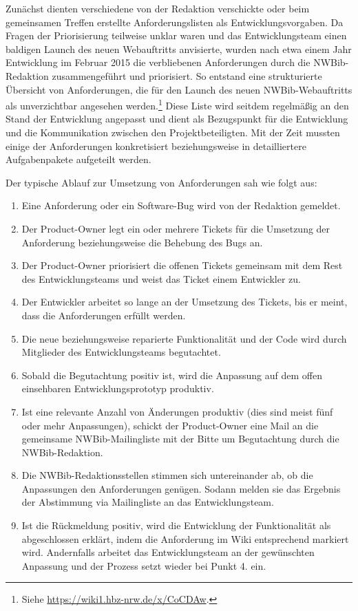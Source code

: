 \documentclass[a4paper,
fontsize=11pt,
oneside,
numbers=noperiodatend,
parskip=half-,
bibliography=totoc,
final
]{scrartcl}
\providecommand{\tightlist}{%
  \setlength{\itemsep}{0pt}\setlength{\parskip}{0pt}}
\begin{document}
Zunächst dienten verschiedene von der Redaktion verschickte oder beim
gemeinsamen Treffen erstellte Anforderungslisten als
Entwicklungsvorgaben. Da Fragen der Priorisierung teilweise unklar waren
und das Entwicklungsteam einen baldigen Launch des neuen Webauftritts
anvisierte, wurden nach etwa einem Jahr Entwicklung im Februar 2015 die
verbliebenen Anforderungen durch die NWBib-Redaktion zusammengeführt und
priorisiert. So entstand eine strukturierte Übersicht von Anforderungen,
die für den Launch des neuen NWBib-Webauftritts als unverzichtbar
angesehen werden.\footnote{Siehe
  \url{https://wiki1.hbz-nrw.de/x/CoCDAw}.} Diese Liste wird seitdem
regelmäßig an den Stand der Entwicklung angepasst und dient als
Bezugspunkt für die Entwicklung und die Kommunikation zwischen den
Projektbeteiligten. Mit der Zeit mussten einige der Anforderungen
konkretisiert beziehungsweise in detailliertere Aufgabenpakete
aufgeteilt werden.

Der typische Ablauf zur Umsetzung von Anforderungen sah wie folgt aus:

\begin{enumerate}
\def\labelenumi{\arabic{enumi}.}
\tightlist
\item
  Eine Anforderung oder ein Software-Bug wird von der Redaktion
  gemeldet.
\item
  Der Product-Owner legt ein oder mehrere Tickets für die Umsetzung der
  Anforderung beziehungsweise die Behebung des Bugs an.
\item
  Der Product-Owner priorisiert die offenen Tickets gemeinsam mit dem
  Rest des Entwicklungsteams und weist das Ticket einem Entwickler zu.
\item
  Der Entwickler arbeitet so lange an der Umsetzung des Tickets, bis er
  meint, dass die Anforderungen erfüllt werden.
\item
  Die neue beziehungsweise reparierte Funktionalität und der Code wird
  durch Mitglieder des Entwicklungsteams begutachtet.
\item
  Sobald die Begutachtung positiv ist, wird die Anpassung auf dem offen
  einsehbaren Entwicklungsprototyp produktiv.
\item
  Ist eine relevante Anzahl von Änderungen produktiv (dies sind meist
  fünf oder mehr Anpassungen), schickt der Product-Owner eine Mail an
  die gemeinsame NWBib-Mailingliste mit der Bitte um Begutachtung durch
  die NWBib-Redaktion.
\item
  Die NWBib-Redaktionsstellen stimmen sich untereinander ab, ob die
  Anpassungen den Anforderungen genügen. Sodann melden sie das Ergebnis
  der Abstimmung via Mailingliste an das Entwicklungsteam.
\item
  Ist die Rückmeldung positiv, wird die Entwicklung der Funktionalität
  als abgeschlossen erklärt, indem die Anforderung im Wiki entsprechend
  markiert wird. Andernfalls arbeitet das Entwicklungsteam an der
  gewünschten Anpassung und der Prozess setzt wieder bei Punkt 4. ein.
\end{enumerate}
\end{document}
